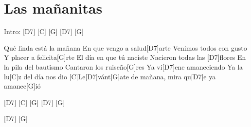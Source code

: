 \section{Las mañanitas}

\noindent
\chordDs
\chordC
\chordG

\vspace{1cm}

\begin{guitar}
	
	Intro: \hspace{0.5cm} [D7] \hspace{0.5cm}[C] \hspace{0.5cm} [G] \hspace{0.5cm}[D7] \hspace{0.5cm} [G]
	
	\newline
	[G]Qué linda está la mañana
	En que vengo a salud[D7]arte
	Venimos todos con gusto
	Y placer a felicita[G]rte
	El día en que tú naciste
	Nacieron todas las [D7]flores
	En la pila del bautismo
	Cantaron los ruiseño[G]res
	Ya vi[D7]ene amaneciendo
	Ya la lu[C]z del día nos dio
	[C]Le[D7]vánt[G]ate de mañana, mira qu[D7]e ya amanec[G]ió
		
	\vspace{0.1cm}
	
	[D7] \hspace{0.5cm}[C] \hspace{0.5cm} [G] \hspace{0.5cm}[D7] \hspace{0.5cm} [G]
	
	[D7] \hspace{0.1cm}[G]
	
\end{guitar}
